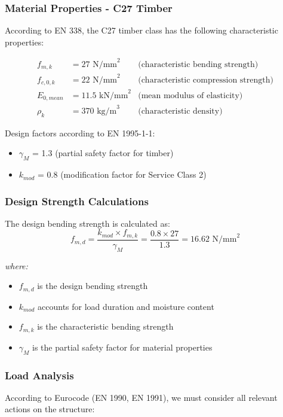 \documentclass[12pt,a4paper]{article}
\begin{document}
\subsubsection{Material Properties - C27 Timber}
According to EN 338, the C27 timber class has the following characteristic properties:

\begin{equation}
\begin{aligned}
f_{m,k} &= 27 \text{ N/mm}^2 & \text{(characteristic bending strength)} \\
f_{c,0,k} &= 22 \text{ N/mm}^2 & \text{(characteristic compression strength)} \\
E_{0,mean} &= 11.5 \text{ kN/mm}^2 & \text{(mean modulus of elasticity)} \\
\rho_k &= 370 \text{ kg/m}^3 & \text{(characteristic density)}
\end{aligned}
\end{equation}

\noindent
Design factors according to EN 1995-1-1:
\begin{itemize}
    \item $\gamma_M$ = 1.3 (partial safety factor for timber)
    \item $k_{mod}$ = 0.8 (modification factor for Service Class 2)
\end{itemize}

\subsubsection{Design Strength Calculations}
The design bending strength is calculated as:
\begin{equation}
f_{m,d} = \frac{k_{mod} \times f_{m,k}}{\gamma_M} = \frac{0.8 \times 27}{1.3} = 16.62 \text{ N/mm}^2
\end{equation}

\noindent
\textit{where:}
\begin{itemize}
    \item $f_{m,d}$ is the design bending strength
    \item $k_{mod}$ accounts for load duration and moisture content
    \item $f_{m,k}$ is the characteristic bending strength
    \item $\gamma_M$ is the partial safety factor for material properties
\end{itemize}

\subsubsection{Load Analysis}
According to Eurocode (EN 1990, EN 1991), we must consider all relevant actions on the structure:
\end{document}

